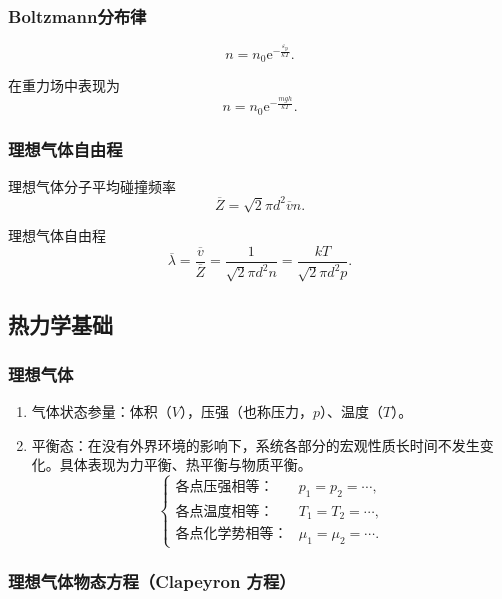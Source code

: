 \documentclass[UTF8,fontset=fandol,zihao=5]{ctexart}
\newcommand{\ee}{\mathrm{e}}
\begin{document}
\subsubsection{Boltzmann分布律}

\[
  n=n_0\ee^{-\frac{\varepsilon_{\mathrm p}}{kT}}.
\]

在重力场中表现为
\[
  n=n_0\ee^{-\frac{mgh}{kT}}.
\]

\subsubsection{理想气体自由程}

理想气体分子平均碰撞频率
\[
  \overline Z=\sqrt2\pi d^2\overline v n.
\]

理想气体自由程
\[
  \overline\lambda=\frac{\overline v}{\overline Z}
  =\frac{1}{\sqrt2\pi d^2n}
  =\frac{kT}{\sqrt2\pi d^2p}.
\]

\subsection{热力学基础}

\subsubsection{理想气体}

\begin{enumerate}
  \item 气体状态参量：体积（\(V\)），压强（也称压力，\(p\)）、温度（\(T\)）。
  \item 平衡态：在没有外界环境的影响下，系统各部分的宏观性质长时间不发生变化。具体表现为力平衡、热平衡与物质平衡。
  \[
    \begin{cases}
      \text{各点压强相等：}&p_1=p_2=\cdots,\\
      \text{各点温度相等：}&T_1=T_2=\cdots,\\
      \text{各点化学势相等：}&\mu_1=\mu_2=\cdots.
    \end{cases}
  \]
\end{enumerate}

\subsubsection{理想气体物态方程（Clapeyron 方程）}
\end{document}
